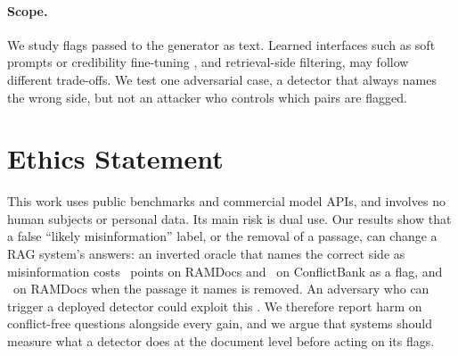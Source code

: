 \paragraph{Scope.} We study flags passed to the generator as text. Learned interfaces such as soft prompts or
credibility fine-tuning \citep{ye2026tcr,pan2024credibility}, and retrieval-side filtering, may follow different
trade-offs. We test one adversarial case, a detector that always names the wrong side, but not an attacker who controls
which pairs are flagged.

\section*{Ethics Statement}
This work uses public benchmarks and commercial model APIs, and involves no human subjects or personal data. Its main
risk is dual use. Our results show that a false ``likely misinformation'' label, or the removal of a passage, can
change a RAG system's answers: an inverted oracle that names the correct side as misinformation costs \aadvDirConf\
points on RAMDocs and \azCbMiniOracleInvFlagDirectionalConflict\ on ConflictBank as a flag, and \aadvRemConf\ on RAMDocs
when the passage it names is removed. An adversary who can trigger a deployed detector could exploit this
\citep{zou2025poisonedrag}. We therefore report harm on conflict-free questions alongside every gain, and we argue that
systems should measure what a detector does at the document level before acting on its flags.
